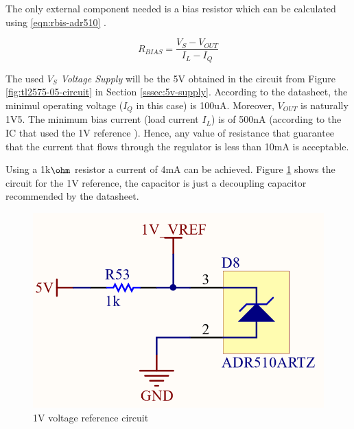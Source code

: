 			The only external component needed is a bias resistor which can be calculated using \ref{eqn:rbis-adr510} \cite{adr510artz-datasheet}.

			\begin{equation}
				R_{BIAS} = \frac{V_{S} - V_{OUT}}{I_{L} - I_{Q}}
			\end{equation}

			The used $V_{S}$ \textit{Voltage Supply} will be the 5V obtained in the circuit from Figure \ref{fig:tl2575-05-circuit} in Section \ref{sssec:5v-supply}. According to the datasheet, the minimul operating voltage ($I_{Q}$ in this case) is 100uA. Moreover, $V_{OUT}$ is naturally 1V5. The minimum bias current (load current $I_{L}$) is of 500nA (according to the IC that used the 1V reference \cite{lm2907-datasheet}). Hence, any value of resistance that guarantee that the current that flows through the regulator is less than 10mA is acceptable.
			\par
			Using a 1k$\ohm$ resistor a current of 4mA can be achieved. Figure \ref{fig:ADR510ARTZ-circuit} shows the circuit for the 1V reference, the capacitor is just a decoupling capacitor recommended by the datasheet.

			\begin{figure}[htbp]
				\centering
					\includegraphics[scale=0.4]{figuras/fig-ADR510ARTZ-circuit.png}
				\caption{1V voltage reference circuit \cite{ADR510ARTZ-circuit}}
				\label{fig:ADR510ARTZ-circuit}
			\end{figure}	 

